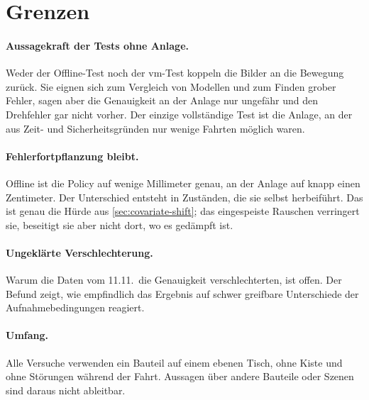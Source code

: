 \section{Grenzen}
\label{sec:grenzen}

\paragraph{Aussagekraft der Tests ohne Anlage.} Weder der Offline-Test noch der \ac{vm}-Test
koppeln die Bilder an die Bewegung zurück. Sie eignen sich zum Vergleich von Modellen und zum
Finden grober Fehler, sagen aber die Genauigkeit an der Anlage nur ungefähr und den Drehfehler
gar nicht vorher. Der einzige vollständige Test ist die Anlage, an der aus Zeit- und
Sicherheitsgründen nur wenige Fahrten möglich waren.

\paragraph{Fehlerfortpflanzung bleibt.} Offline ist die Policy auf wenige Millimeter genau, an
der Anlage auf knapp einen Zentimeter. Der Unterschied entsteht in Zuständen, die sie selbst
herbeiführt. Das ist genau die Hürde aus \cref{sec:covariate-shift}; das eingespeiste
Rauschen verringert sie, beseitigt sie aber nicht dort, wo es gedämpft ist.

\paragraph{Ungeklärte Verschlechterung.} Warum die Daten vom 11.11.\ die Genauigkeit
verschlechterten, ist offen. Der Befund zeigt, wie empfindlich das Ergebnis auf schwer
greifbare Unterschiede der Aufnahmebedingungen reagiert.

\paragraph{Umfang.} Alle Versuche verwenden ein Bauteil auf einem ebenen Tisch, ohne Kiste und
ohne Störungen während der Fahrt. Aussagen über andere Bauteile oder Szenen sind daraus nicht
ableitbar.
